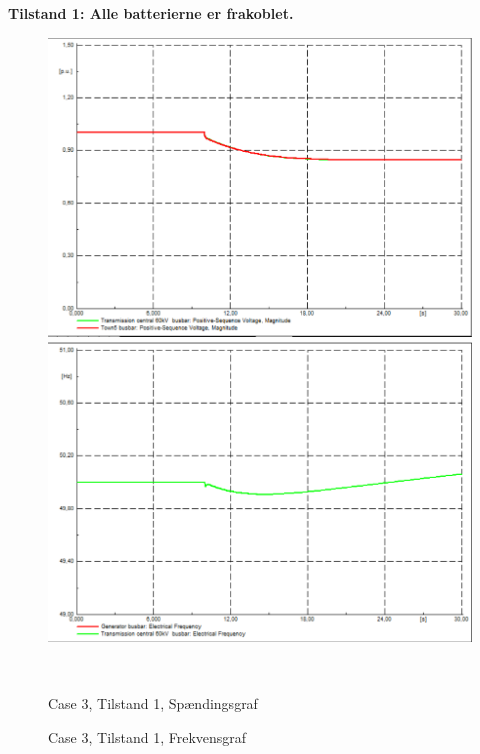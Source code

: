 \newpage
\textbf{Tilstand 1: Alle batterierne er frakoblet.}
\begin{figure}[H]
	\centering
	\begin{minipage}[b]{0.48\textwidth}
		\centering
		\includegraphics[width=1.00\textwidth]{figurer/LargeDisturbance/Voltage1} %
	\end{minipage}
	\hfill
	\begin{minipage}[b]{0.48\textwidth}
		\centering
		\includegraphics[width=1.00\textwidth]{figurer/LargeDisturbance/Freq1} %
	\end{minipage}
	\\ %
	\begin{minipage}[t]{0.48\textwidth}
		\caption{Case 3, Tilstand 1, Spændingsgraf} %
		\label{fig:C3T1V}
	\end{minipage}
	\hfill
	\begin{minipage}[t]{0.48\textwidth}
		\caption{Case 3, Tilstand 1, Frekvensgraf} %
		\label{fig:C3T1F}
	\end{minipage}
\end{figure}

